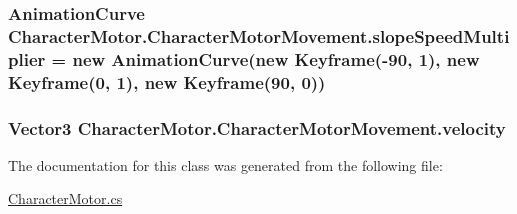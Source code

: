 \subsubsection[{slope\+Speed\+Multiplier}]{\setlength{\rightskip}{0pt plus 5cm}Animation\+Curve Character\+Motor.\+Character\+Motor\+Movement.\+slope\+Speed\+Multiplier = new Animation\+Curve(new Keyframe(-\/90, 1), new Keyframe(0, 1), new Keyframe(90, 0))}\label{class_character_motor_1_1_character_motor_movement_ab157f4037ba87d83810d2bf59b78803e}
\hypertarget{class_character_motor_1_1_character_motor_movement_a602814fda948d4dbc79a2b4f18386ce1}{}
\subsubsection[{velocity}]{\setlength{\rightskip}{0pt plus 5cm}Vector3 Character\+Motor.\+Character\+Motor\+Movement.\+velocity}\label{class_character_motor_1_1_character_motor_movement_a602814fda948d4dbc79a2b4f18386ce1}


The documentation for this class was generated from the following file\+:\begin{DoxyCompactItemize}
\item 
\hyperlink{_character_motor_8cs}{Character\+Motor.\+cs}\end{DoxyCompactItemize}

